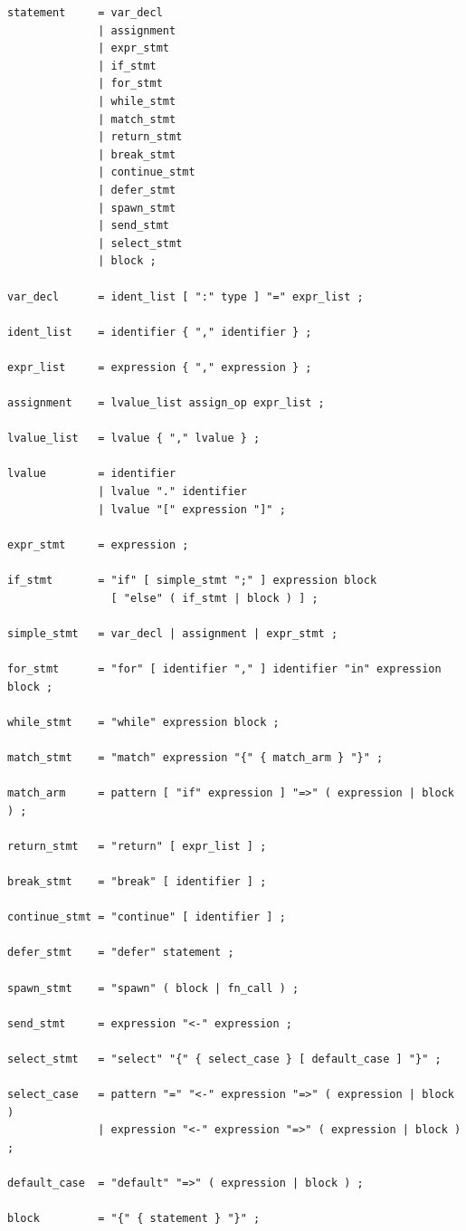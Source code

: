 \begin{lstlisting}[language=EBNF]
statement     = var_decl
              | assignment
              | expr_stmt
              | if_stmt
              | for_stmt
              | while_stmt
              | match_stmt
              | return_stmt
              | break_stmt
              | continue_stmt
              | defer_stmt
              | spawn_stmt
              | send_stmt
              | select_stmt
              | block ;

var_decl      = ident_list [ ":" type ] "=" expr_list ;

ident_list    = identifier { "," identifier } ;

expr_list     = expression { "," expression } ;

assignment    = lvalue_list assign_op expr_list ;

lvalue_list   = lvalue { "," lvalue } ;

lvalue        = identifier
              | lvalue "." identifier
              | lvalue "[" expression "]" ;

expr_stmt     = expression ;

if_stmt       = "if" [ simple_stmt ";" ] expression block
                [ "else" ( if_stmt | block ) ] ;

simple_stmt   = var_decl | assignment | expr_stmt ;

for_stmt      = "for" [ identifier "," ] identifier "in" expression block ;

while_stmt    = "while" expression block ;

match_stmt    = "match" expression "{" { match_arm } "}" ;

match_arm     = pattern [ "if" expression ] "=>" ( expression | block ) ;

return_stmt   = "return" [ expr_list ] ;

break_stmt    = "break" [ identifier ] ;

continue_stmt = "continue" [ identifier ] ;

defer_stmt    = "defer" statement ;

spawn_stmt    = "spawn" ( block | fn_call ) ;

send_stmt     = expression "<-" expression ;

select_stmt   = "select" "{" { select_case } [ default_case ] "}" ;

select_case   = pattern "=" "<-" expression "=>" ( expression | block )
              | expression "<-" expression "=>" ( expression | block ) ;

default_case  = "default" "=>" ( expression | block ) ;

block         = "{" { statement } "}" ;
\end{lstlisting}

